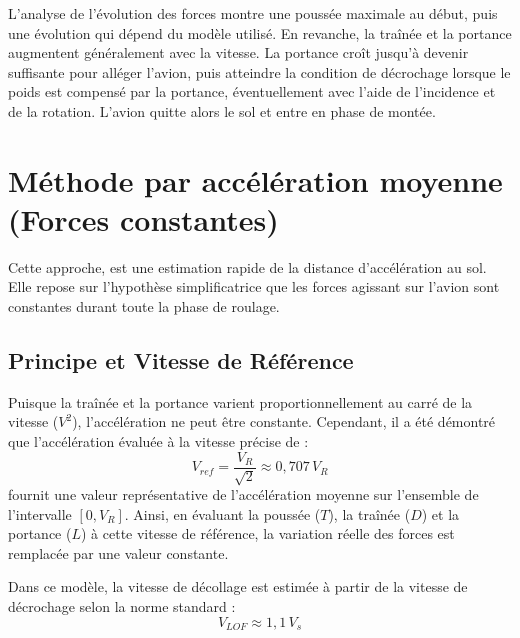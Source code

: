 		L’analyse de l’évolution des forces montre une poussée maximale au début, puis une évolution qui dépend
		du modèle utilisé. En revanche, la traînée et la portance augmentent généralement avec la vitesse. La
		portance croît jusqu’à devenir suffisante pour alléger l’avion, puis atteindre la condition de décrochage
		lorsque le poids est compensé par la portance, éventuellement avec l’aide de l’incidence et de la
		rotation. L’avion quitte alors le sol et entre en phase de montée.
			  
			  
			
		
			
		
		

\vspace*{2cm}

%
	
	\section{Méthode par accélération moyenne (Forces constantes)} 
	
		Cette approche, est une estimation rapide de la distance d'accélération au sol.
		 Elle repose sur l'hypothèse simplificatrice que les forces agissant sur l'avion
		  sont constantes durant toute la phase de roulage. 
		
		\vspace*{1cm}
		
		\subsection{Principe et Vitesse de Référence}
			Puisque la traînée et la portance varient proportionnellement au carré de 
			la vitesse ($V^2$), l'accélération ne peut être constante. Cependant, il a été
			 démontré que l'accélération évaluée à la vitesse précise de :
			\[ V_{ref} = \frac{V_R}{\sqrt{2}} \approx 0,707 \, V_R \]
			fournit une valeur représentative de l'accélération moyenne sur l'ensemble
			 de l'intervalle $[0, V_R]$. Ainsi, en évaluant la poussée ($T$), la traînée ($D$)
			  et la portance ($L$) à cette vitesse de référence, la variation réelle des forces
			   est remplacée par une valeur constante.
			
			Dans ce modèle, la vitesse de décollage est estimée à partir de la vitesse de décrochage selon la norme standard  :
			\[ V_{LOF} \approx 1,1 \, V_s \]
			
